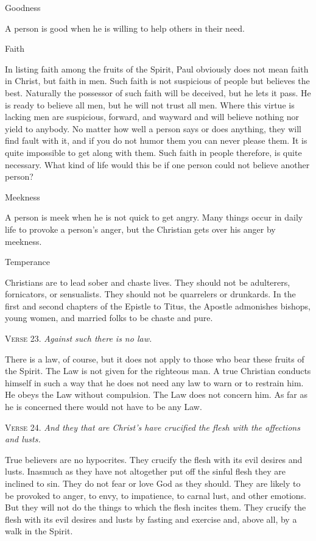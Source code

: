 Goodness

A person is good when he is willing to help others in their need.

Faith

In listing faith among the fruits of the Spirit, Paul obviously does not mean faith in Christ, but faith in men. Such faith is not suspicious of people but believes the best. Naturally the possessor of such faith will be deceived, but he lets it pass. He is ready to believe all men, but he will not trust all men. Where this virtue is lacking men are suspicious, forward, and wayward and will believe nothing nor yield to anybody. No matter how well a person says or does anything, they will find fault with it, and if you do not humor them you can never please them. It is quite impossible to get along with them. Such faith in people therefore, is quite necessary. What kind of life would this be if one person could not believe another person?

Meekness

A person is meek when he is not quick to get angry. Many things occur in daily life to provoke a person’s anger, but the Christian gets over his anger by meekness.

Temperance

Christians are to lead sober and chaste lives. They should not be adulterers, fornicators, or sensualists. They should not be quarrelers or drunkards. In the first and second chapters of the Epistle to Titus, the Apostle admonishes bishops, young women, and married folks to be chaste and pure.

\textsc{Verse} 23. \emph{Against such there is no law.}

There is a law, of course, but it does not apply to those who bear these fruits of the Spirit. The Law is not given for the righteous man. A true Christian conducts himself in such a way that he does not need any law to warn or to restrain him. He obeys the Law without compulsion. The Law does not concern him. As far as he is concerned there would not have to be any Law.

\textsc{Verse} 24. \emph{And they that are Christ’s have crucified the flesh with the affections and lusts.}

True believers are no hypocrites. They crucify the flesh with its evil desires and lusts. Inasmuch as they have not altogether put off the sinful flesh they are inclined to sin. They do not fear or love God as they should. They are likely to be provoked to anger, to envy, to impatience, to carnal lust, and other emotions. But they will not do the things to which the flesh incites them. They crucify the flesh with its evil desires and lusts by fasting and exercise and, above all, by a walk in the Spirit.


